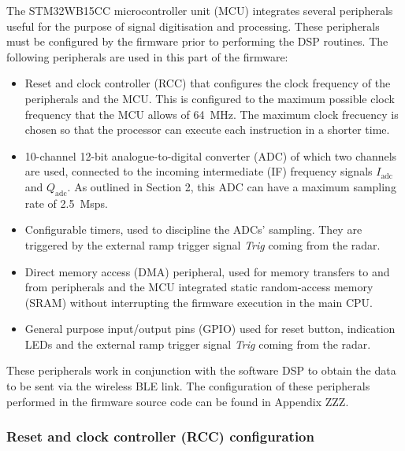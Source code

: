 The STM32WB15CC microcontroller unit (MCU) integrates several peripherals useful for the purpose of signal digitisation and processing. These peripherals must be configured by the firmware prior to performing the DSP routines. The following peripherals are used in this part of the firmware:
\begin{itemize}
	\item Reset and clock controller (RCC) that configures the clock frequency of the peripherals and the MCU. This is configured to the maximum possible clock frequency that the MCU allows of \SI{64}{\mega\hertz}. The maximum clock frecuency is chosen so that the processor can execute each instruction in a shorter time.
	\item 10-channel 12-bit analogue-to-digital converter (ADC) of which two channels are used, connected to the incoming intermediate (IF) frequency signals $I_{\mathrm{adc}}$ and $Q_{\mathrm{adc}}$. As outlined in Section 2, this ADC can have a maximum sampling rate of \SI{2.5}{Msps}.
	\item Configurable timers, used to discipline the ADCs' sampling. They are trig\-gered by the external ramp trigger signal \textit{Trig} coming from the radar.
	\item Direct memory access (DMA) peripheral, used for memory transfers to and from peripherals and the MCU integrated static random-access memory (SRAM) without interrupting the firmware execution in the main CPU.
	\item General purpose input/output pins (GPIO) used for reset button, indication LEDs and the external ramp trigger signal \textit{Trig} coming from the radar.
\end{itemize}

These peripherals work in conjunction with the software DSP to obtain the data to be sent via the wireless BLE link. The configuration of these peripherals performed in the firmware source code can be found in Appendix ZZZ.

\subsubsection{Reset and clock controller (RCC) configuration} \label{sec:rcc}

